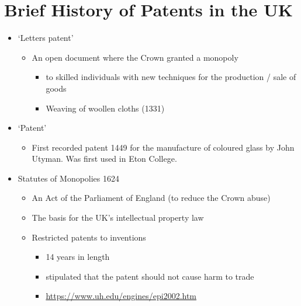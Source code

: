 \documentclass{article}
\begin{document}
\section{Brief History of Patents in the UK}
\begin{itemize}
\item `Letters patent'
\begin{itemize}
\item An open document where the Crown granted a monopoly 
\begin{itemize}
\item to skilled individuals with new techniques for the production / sale of goods
\item Weaving of woollen cloths (1331)
\end{itemize}
\end{itemize}
\item `Patent'
\begin{itemize}
\item First recorded patent 1449 for the manufacture of coloured glass by John Utyman. Was first used in Eton College.
\end{itemize}
\item Statutes of Monopolies 1624
\begin{itemize}
\item An Act of the Parliament of England (to reduce the Crown abuse)
\item The basis for the UK's intellectual property law 
\item Restricted patents to inventions
\begin{itemize}
\item 14 years in length
\item stipulated that the patent should not cause harm to trade
\item \url{https://www.uh.edu/engines/epi2002.htm}
\end{itemize}
\end{itemize}
\end{itemize}
\end{document}
